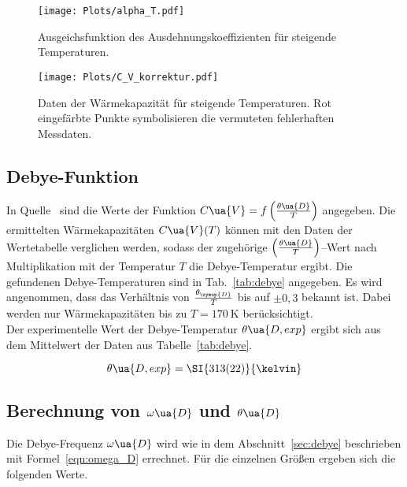 \begin{figure}[h]
  \centering
  \texttt{[image: Plots/alpha\_T.pdf]}
  \caption{Ausgeichsfunktion des Ausdehnungskoeffizienten für steigende Temperaturen.}
  \label{fig:alpha}
\end{figure}



\FloatBarrier
\begin{figure}
  \centering
  \texttt{[image: Plots/C\_V\_korrektur.pdf]}
  \caption{Daten der Wärmekapazität für steigende Temperaturen. Rot eingefärbte Punkte symbolisieren die vermuteten fehlerhaften Messdaten.}
  \label{fig:c_v}
\end{figure}

\subsection{Debye-Funktion}

In Quelle~\cite{anleitung} sind die Werte der Funktion $C\ua{V} = f\left(\frac{\theta\ua{D}}{T}\right)$
angegeben. Die ermittelten Wärmekapazitäten $C\ua{V}(T)$ können
mit den Daten der Wertetabelle verglichen werden, sodass
der zugehörige $\left(\frac{\theta\ua{D}}{T}\right)$--Wert nach Multiplikation
mit der Temperatur $T$ die Debye-Temperatur ergibt.
Die gefundenen Debye-Temperaturen sind in Tab.~\ref{tab:debye} angegeben.
Es wird angenommen, dass das Verhältnis von $\frac{\theta_{\symup{D}}}{T}$
bis auf $\pm 0,3$ bekannt ist.
Dabei werden nur Wärmekapazitäten bis zu $T = \SI{170}{\kelvin}$ berücksichtigt.\\
Der experimentelle Wert der Debye-Temperatur $\theta\ua{D, exp}$ ergibt sich aus dem Mittelwert
der Daten aus Tabelle~\ref{tab:debye}.

\begin{equation}
  \label{eqn:debye}
  \theta\ua{D, exp} = \SI{313(22)}{\kelvin}
\end{equation}

\subsection{Berechnung von $\omega\ua{D}$ und $\theta\ua{D}$}

Die Debye-Frequenz $\omega\ua{D}$ wird wie in dem Abschnitt~\ref{sec:debye} beschrieben mit Formel~\eqref{eqn:omega_D}
errechnet.
Für die einzelnen Größen ergeben sich die folgenden Werte.

